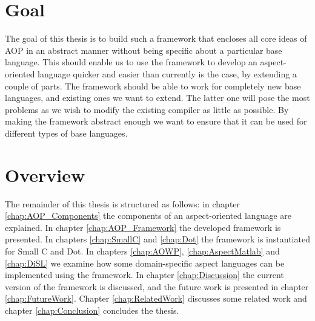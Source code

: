 \documentclass[a4paper]{report}
\begin{document}
\section{Goal}
The goal of this thesis is to build such a framework that encloses all core ideas of AOP in an abstract manner without being specific about a particular base language. This should enable us to use the framework to develop an aspect-oriented language quicker and easier than currently is the case, by extending a couple of parts. The framework should be able to work for completely new base languages, and existing ones we want to extend. The latter one will pose the most problems as we wish to modify the existing compiler as little as possible. By making the framework abstract enough we want to ensure that it can be used for different types of base languages. 

\section{Overview}
The remainder of this thesis is structured as follows: in chapter \ref{chap:AOP_Components} the components of an aspect-oriented language are explained. In chapter \ref{chap:AOP_Framework} the developed framework is presented. In chapters \ref{chap:SmallC} and \ref{chap:Dot} the framework is instantiated for Small C and Dot. In chapters \ref{chap:AOWP}, \ref{chap:AspectMatlab} and \ref{chap:DiSL} we examine how some domain-specific aspect languages can be implemented using the framework. In chapter \ref{chap:Discussion} the current version of the framework is discussed, and the future work is presented in chapter \ref{chap:FutureWork}. Chapter \ref{chap:RelatedWork} discusses some related work and chapter \ref{chap:Conclusion} concludes the thesis.
\end{document}
